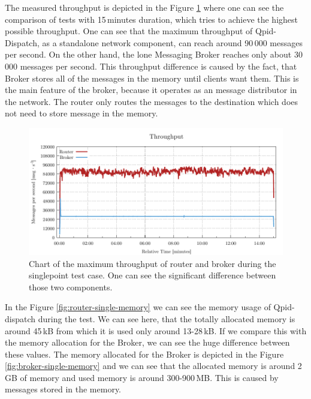The measured throughput is depicted in the Figure \ref{fig:rate-single} where one can see the comparison of tests with 15\,minutes duration, which tries to achieve the highest possible throughput. One can see that the maximum throughput of Qpid-Dispatch, as a standalone network component, can reach around 90\,000 messages per second. On the other hand, the lone Messaging Broker reaches only about 30\,000 messages per second. This throughput difference is caused by the fact, that Broker stores all of the messages in the memory until clients want them. This is the main feature of the broker, because it operates as an message distributor in the network. The router only routes the messages to the destination which does not need to store message in the memory.

\begin{figure}[H]
	\centering
	\includegraphics[width=1\linewidth]{obrazky-figures/charts/singlepoint-throughput.pdf}
	\caption{Chart of the maximum throughput of router and broker during the singlepoint test case. One can see the significant difference between those two components.}
	\label{fig:rate-single}
\end{figure}

In the Figure \ref{fig:router-single-memory} we can see the memory usage of Qpid-dispatch during the test. We can see here, that the totally allocated memory is around 45\,kB from which it is used only around 13-28\,kB. If we compare this with the memory allocation for the Broker, we can see the huge difference between these values. The memory allocated for the Broker is depicted in the Figure \ref{fig:broker-single-memory} and we can see that the allocated memory is around 2\,GB of memory and used memory is around 300-900\,MB. This is caused by messages stored in the memory.

